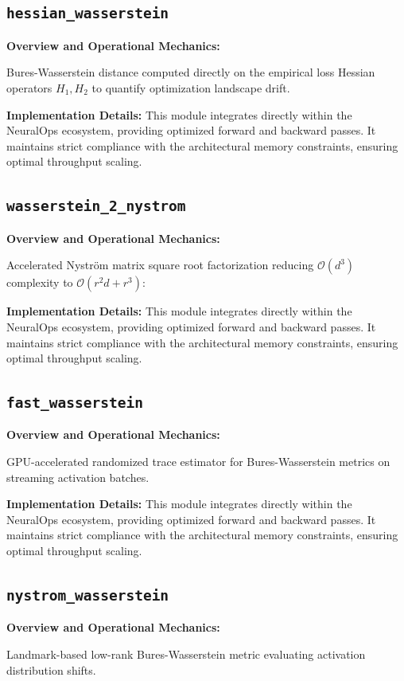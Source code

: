 \documentclass[10pt,twocolumn,letterpaper]{article}
\begin{document}
\subsection{\texttt{hessian\_wasserstein}}
\textbf{Overview and Operational Mechanics:}

Bures-Wasserstein distance computed directly on the empirical loss Hessian operators $H_1, H_2$ to quantify optimization landscape drift.

\textbf{Implementation Details:}
This module integrates directly within the NeuralOps ecosystem, providing optimized forward and backward passes. It maintains strict compliance with the architectural memory constraints, ensuring optimal throughput scaling.

\subsection{\texttt{wasserstein\_2\_nystrom}}
\textbf{Overview and Operational Mechanics:}

Accelerated Nystr\"om matrix square root factorization reducing $\mathcal{O}(d^3)$ complexity to $\mathcal{O}(r^2 d + r^3)$:

\textbf{Implementation Details:}
This module integrates directly within the NeuralOps ecosystem, providing optimized forward and backward passes. It maintains strict compliance with the architectural memory constraints, ensuring optimal throughput scaling.

\subsection{\texttt{fast\_wasserstein}}
\textbf{Overview and Operational Mechanics:}

GPU-accelerated randomized trace estimator for Bures-Wasserstein metrics on streaming activation batches.

\textbf{Implementation Details:}
This module integrates directly within the NeuralOps ecosystem, providing optimized forward and backward passes. It maintains strict compliance with the architectural memory constraints, ensuring optimal throughput scaling.

\subsection{\texttt{nystrom\_wasserstein}}
\textbf{Overview and Operational Mechanics:}

Landmark-based low-rank Bures-Wasserstein metric evaluating activation distribution shifts.
\end{document}

